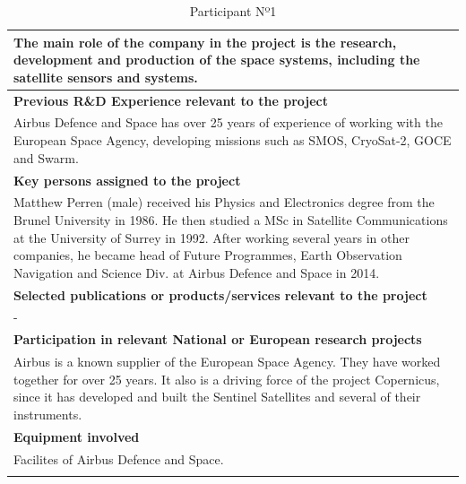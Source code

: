 \begin{longtable}[H]{|p{0.7cm}|p{4cm}|p{7cm}|p{1.3cm}|}
	\multicolumn{4}{|p{14.5cm}|}{The main role of the company in the project is the research, development and production of the space systems, including the satellite sensors and systems.}  \\ \hline
	
	\multicolumn{4}{|p{14.5cm}|}{\textbf{Previous R\&D Experience relevant to the project}}  \\ \hline
	
	\multicolumn{4}{|p{13cm}|}{Airbus Defence and Space has over 25 years of experience of working with the European Space Agency, developing missions such as SMOS, CryoSat-2, GOCE and Swarm.}  \\ \hline
	
	\multicolumn{4}{|p{13cm}|}{\textbf{Key persons assigned to the project}}   \\ \hline
	
	
	\multicolumn{4}{|p{14.5cm}|}{Matthew Perren (male) received his Physics and Electronics degree from the Brunel University in 1986. He then studied a MSc in Satellite Communications at the University of Surrey in 1992. After working several years in other companies, he became head of Future Programmes, Earth Observation Navigation and Science Div. at Airbus Defence and Space in 2014.}  \\ \hline
	
	\multicolumn{4}{|p{13cm}|}{\textbf{Selected publications or products/services relevant to the project}}  \\ \hline
	
	\multicolumn{4}{|p{14.5cm}|}{-}  \\ \hline
	
	\multicolumn{4}{|p{13cm}|}{\textbf{Participation in relevant National or European research projects}}  \\ \hline
	
	\multicolumn{4}{|p{14.5cm}|}{Airbus is a known supplier of the European Space Agency. They have worked together for over 25 years. It also is a driving force of the project Copernicus, since it has developed and built the Sentinel Satellites and several of their instruments.}  \\ \hline
	
	\multicolumn{4}{|p{13cm}|}{\textbf{Equipment involved}}  \\ \hline
	
	\multicolumn{4}{|p{14.5cm}|}{Facilites of Airbus Defence and Space.}  \\ \hline
	\caption{Participant Nº1}
\end{longtable}



